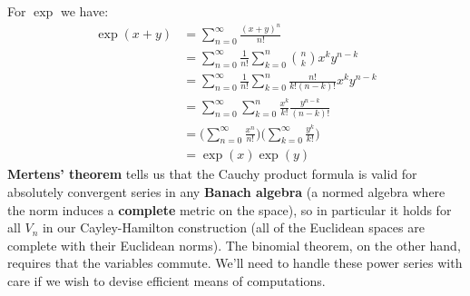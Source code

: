 \documentclass{article}
\begin{document}
            For $\exp$ we have:
            \begin{subequations}
                \begin{align}
                    \exp(x+y)
                    &=\sum_{n=0}^{\infty}\frac{(x+y)^{n}}{n!}\\
                    &=\sum_{n=0}^{\infty}\frac{1}{n!}
                        \sum_{k=0}^{n}\binom{n}{k}x^{k}y^{n-k}\\
                    &=\sum_{n=0}^{\infty}\frac{1}{n!}
                        \sum_{k=0}^{n}\frac{n!}{k!(n-k)!}x^{k}y^{n-k}\\
                    &=\sum_{n=0}^{\infty}\sum_{k=0}^{n}
                        \frac{x^{k}}{k!}\frac{y^{n-k}}{(n-k)!}\\
                    &=\Big(\sum_{n=0}^{\infty}\frac{x^{n}}{n!}\Big)
                        \Big(\sum_{k=0}^{\infty}\frac{y^{k}}{k!}\Big)\\
                    &=\exp(x)\exp(y)
                \end{align}
            \end{subequations}
            \textbf{Mertens' theorem} tells us that the Cauchy product formula
            is valid for absolutely convergent series in any
            \textbf{Banach algebra} (a normed algebra where the norm induces
            a \textbf{complete} metric on the space), so in particular it holds
            for all $V_{n}$ in our Cayley-Hamilton construction
            (all of the Euclidean spaces are complete with their Euclidean
            norms). The binomial theorem, on the other hand, requires that the
            variables commute. We'll need to handle these power series with
            care if we wish to devise efficient means of computations.
\end{document}

